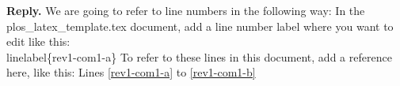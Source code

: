 \documentclass{article}
\newenvironment{Reply}{\noindent\color{BlueViolet}\textbf{Reply.}}{\vspace{1em}}
\begin{document}
\begin{Reply}
   We are going to refer to line numbers in the following way: In the plos\_latex\_template.tex document, add a line number label where you want to edit like this: \\ linelabel\{rev1-com1-a\}
   To refer to these lines in this document, add a reference here, like this: Lines   \ref{rev1-com1-a} to \ref{rev1-com1-b}
   



\end{Reply}
\end{document}
